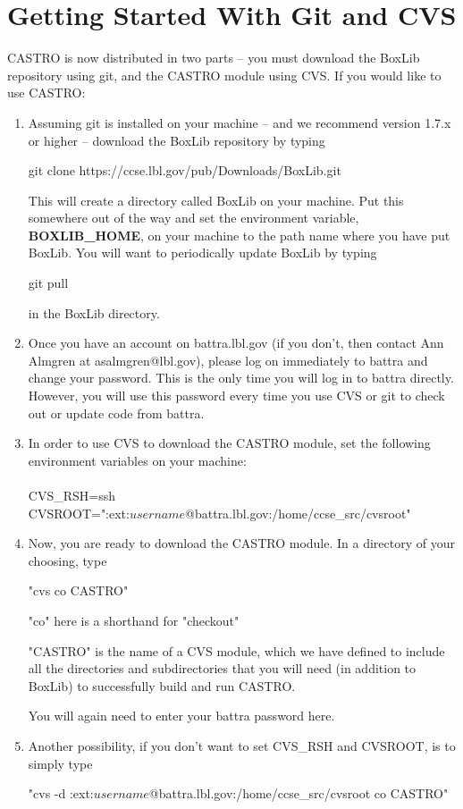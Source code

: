 
\section{Getting Started With Git and CVS}

CASTRO is now distributed in two parts -- you must download the BoxLib repository using git, and the CASTRO module 
using CVS.  If you would like to use CASTRO:

\begin{enumerate}

\item Assuming git is installed on your machine -- and we recommend version 1.7.x or higher -- download the
BoxLib repository by typing 

\noindent git clone https://ccse.lbl.gov/pub/Downloads/BoxLib.git 

\noindent This will create a directory called BoxLib on your machine.  Put this somewhere out of the way and 
set the environment variable, {\bf BOXLIB\_HOME}, on your machine to the path name where
you have put BoxLib.    You will want to periodically update BoxLib by typing 

\noindent git pull

in the BoxLib directory.  

\item Once you have an account on battra.lbl.gov (if you don't, then contact Ann Almgren at asalmgren@lbl.gov),
please log on immediately to battra and change your password.
This is the only time you will log in to battra directly.  However, you will use this password every
time you use CVS or git to check out or update code from battra.

\item In order to use CVS to download the CASTRO module, set the following environment variables on your machine: \\ \\ 
CVS\_RSH=ssh \\
CVSROOT=":ext:$username$@battra.lbl.gov:/home/ccse\_src/cvsroot" 

\item Now, you are ready to download the CASTRO module.  In a directory of your choosing, type 

"cvs co CASTRO"

"co" here is a shorthand for "checkout"

"CASTRO" is the name of a CVS module, which we have defined to include all the directories and subdirectories 
that you will need (in addition to BoxLib) to successfully build and run CASTRO.

You will again need to enter your battra password here.

\item Another possibility, if you don't want to set CVS\_RSH and CVSROOT, is to simply type

"cvs -d :ext:$username$@battra.lbl.gov:/home/ccse\_src/cvsroot co CASTRO"

\end{enumerate}

